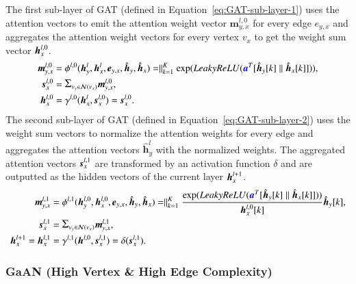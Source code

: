 The first sub-layer of GAT (defined in Equation~\ref{eq:GAT-sub-layer-1}) uses the attention vectors to emit the attention weight vector $\boldsymbol{m}^{l,0}_{y,x}$ for every edge $e_{y,x}$ and aggregates the attention weight vectors for every vertex $v_x$ to get the weight sum vector $\boldsymbol{h}^{l,0}_x$.
%
\begin{equation}
    \label{eq:GAT-sub-layer-1}
    \begin{aligned}
        \MyVec{m}^{l,0}_{y,x} & = \phi^{l,0}(\MyVec{h}^l_y, \MyVec{h}^l_x, \MyVec{e}_{y,x}, \hvec{y}, \hvec{x}) = \parallel_{k=1}^{K}\GATCalcWeight, \\
        \MyVec{s}^{l,0}_{x} &= \mathlarger{\Sigma}_{v_y \in \mathcal{N}(v_x)}{\MyVec{m}^{l,0}_{y,x}}, \\
        \MyVec{h}^{l,0}_{x} &= \gamma^{l,0}(\MyVec{h}^l_x, \MyVec{s}^{l,0}_{x})  = \MyVec{s}^{l,0}_{x}.
    \end{aligned}
\end{equation}
%
The second sub-layer of GAT (defined in Equation~\ref{eq:GAT-sub-layer-2}) uses the weight sum vectors to normalize the attention weights for every edge and aggregates the attention vectors $\boldsymbol{\hat{h}}^l_y$ with the normalized weights.
%
The aggregated attention vectors $\boldsymbol{s}^{l,1}_x$ are transformed by an activation function $\delta$ and are outputted as the hidden vectors of the current layer $\boldsymbol{h}^{l+1}_x$.
%
\begin{equation}
        \label{eq:GAT-sub-layer-2}
    \begin{aligned}
        \MyVec{m}^{l,1}_{y,x} &= \phi^{l,1}(\MyVec{h}^{l,0}_y, \MyVec{h}^{l,0}_x, \MyVec{e}_{y,x}, \hvec{y}, \hvec{x}) = \parallel_{k=1}^{K}\frac{\GATCalcWeight}{\MyVec{h}^{l,0}_x[k]}\hvec{y}[k], \\
        \MyVec{s}^{l,1}_x &= \mathlarger{\Sigma}_{v_y \in \mathcal{N}(v_x)} \MyVec{m}^{l,1}_{y,x}, \\
        \MyVec{h}^{l+1}_x = \MyVec{h}^{l,1}_x &= \gamma^{l,1}(\MyVec{h}^{l,0}, \MyVec{s}^{l,1}_x) = \delta(\MyVec{s}^{l,1}_x).
    \end{aligned}
\end{equation}

\subsubsection{GaAN (High Vertex \& High Edge Complexity)}

